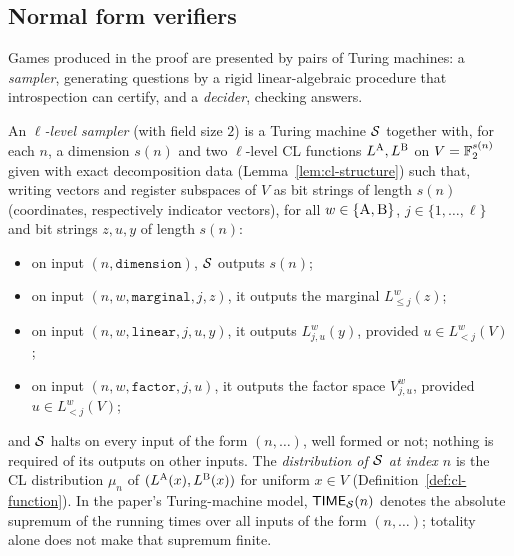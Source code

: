 \subsection{Normal form verifiers}
\label{sec:normal-form-verifiers}

Games produced in the proof are presented by pairs of Turing machines: a
\emph{sampler}, generating questions by a rigid linear-algebraic procedure that
introspection can certify, and a \emph{decider}, checking answers.

\begin{definition}[Sampler]
\label{def:sampler}
\leanok
An \emph{$\ell$-level sampler} (with field size $2$) is a Turing machine $\mathcal{S}$ together
with, for each $n$, a dimension $s(n)$ and two $\ell$-level CL functions $L^{\textsc{A}}, L^{\textsc{B}}$ on
$V = \mathbb{F}_2^{s(n)}$ given with exact decomposition data (Lemma~\ref{lem:cl-structure}) such
that, writing vectors and register subspaces of $V$ as bit strings of length $s(n)$
(coordinates, respectively indicator vectors), for all $w \in \{\textsc{A}, \textsc{B}\}$, $j \in \{1,
\ldots, \ell\}$ and bit strings $z, u, y$ of length $s(n)$:
\begin{itemize}
\item on input $(n, \mathtt{dimension})$, $\mathcal{S}$ outputs $s(n)$;
\item on input $(n, w, \mathtt{marginal}, j, z)$, it outputs the marginal $L^w_{\leq j}(z)$;
\item on input $(n, w, \mathtt{linear}, j, u, y)$, it outputs $L^w_{j,u}(y)$, provided
  $u \in L^w_{<j}(V)$;
\item on input $(n, w, \mathtt{factor}, j, u)$, it outputs the factor space $V^w_{j,u}$,
  provided $u \in L^w_{<j}(V)$;
\end{itemize}
and $\mathcal{S}$ halts on every input of the form $(n, \ldots)$, well formed or not; nothing is
required of its outputs on other inputs. The \emph{distribution of $\mathcal{S}$ at index $n$}
is the CL distribution $\mu_n$ of $(L^{\textsc{A}}(x), L^{\textsc{B}}(x))$ for uniform $x \in V$
(Definition~\ref{def:cl-function}). In the paper's Turing-machine model,
$\mathsf{TIME}_{\mathcal{S}}(n)$ denotes the absolute supremum of the running times over all inputs
of the form $(n, \ldots)$; totality alone does not make that supremum finite.
\end{definition}

